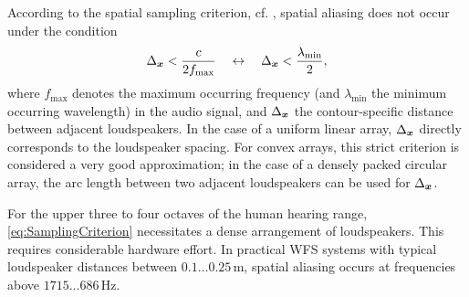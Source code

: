 According to the spatial sampling criterion,
cf. \cite[Ch.~26.4]{Skudrzyk1971}, spatial aliasing does not occur
under the condition \cite[p.~246]{Stenzel1927}
\begin{align}
\label{eq:SamplingCriterion}
\Delta_{\bm{x}} < \frac{c}{2 f_\text{max}}\quad\leftrightarrow\quad
\Delta_{\bm{x}} < \frac{\lambda_\text{min}}{2},
\end{align}
where $f_\text{max}$ denotes the maximum occurring frequency
(and $\lambda_\text{min}$ the minimum occurring wavelength)
in the audio signal, and $\Delta_{\bm{x}}$ the contour-specific distance
between adjacent loudspeakers.
%
In the case of a uniform linear array, $\Delta_{\bm{x}}$
directly corresponds to the loudspeaker spacing.
%
For convex arrays, this strict criterion is considered a very good
approximation; in the case of a densely packed circular array,
the arc length between two adjacent loudspeakers can be used for
$\Delta_{\bm{x}}$.



For the upper three to four octaves of the human hearing range,
\myeq\eqref{eq:SamplingCriterion} necessitates a dense arrangement of
loudspeakers. This requires considerable hardware effort.
%
In practical WFS systems with typical loudspeaker distances between
$0{.}1 \dots 0{.}25\,\text{m}$, spatial aliasing occurs at frequencies
above $1715 \dots 686\,\text{Hz}$.




